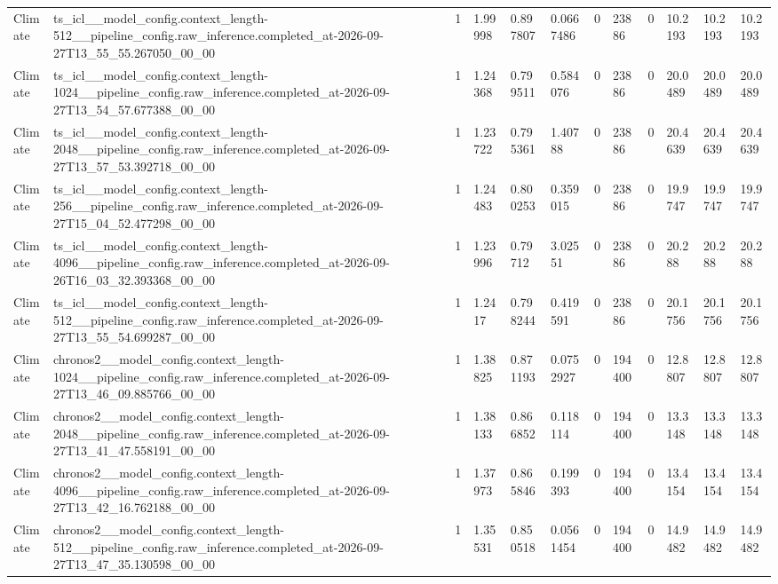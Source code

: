 \begin{tabular}{llllllllllll}
Climate & ts\_icl\_\_model\_config.context\_length-512\_\_pipeline\_config.raw\_inference.completed\_at-2026-09-27T13\_55\_55.267050\_00\_00 & 1 & 1.99998 & 0.897807 & 0.0667486 & 0 & 23886 & 0 & 10.2193 & 10.2193 & 10.2193 \\
Climate & ts\_icl\_\_model\_config.context\_length-1024\_\_pipeline\_config.raw\_inference.completed\_at-2026-09-27T13\_54\_57.677388\_00\_00 & 1 & 1.24368 & 0.799511 & 0.584076 & 0 & 23886 & 0 & 20.0489 & 20.0489 & 20.0489 \\
Climate & ts\_icl\_\_model\_config.context\_length-2048\_\_pipeline\_config.raw\_inference.completed\_at-2026-09-27T13\_57\_53.392718\_00\_00 & 1 & 1.23722 & 0.795361 & 1.40788 & 0 & 23886 & 0 & 20.4639 & 20.4639 & 20.4639 \\
Climate & ts\_icl\_\_model\_config.context\_length-256\_\_pipeline\_config.raw\_inference.completed\_at-2026-09-27T15\_04\_52.477298\_00\_00 & 1 & 1.24483 & 0.800253 & 0.359015 & 0 & 23886 & 0 & 19.9747 & 19.9747 & 19.9747 \\
Climate & ts\_icl\_\_model\_config.context\_length-4096\_\_pipeline\_config.raw\_inference.completed\_at-2026-09-26T16\_03\_32.393368\_00\_00 & 1 & 1.23996 & 0.79712 & 3.02551 & 0 & 23886 & 0 & 20.288 & 20.288 & 20.288 \\
Climate & ts\_icl\_\_model\_config.context\_length-512\_\_pipeline\_config.raw\_inference.completed\_at-2026-09-27T13\_55\_54.699287\_00\_00 & 1 & 1.2417 & 0.798244 & 0.419591 & 0 & 23886 & 0 & 20.1756 & 20.1756 & 20.1756 \\
Climate & chronos2\_\_model\_config.context\_length-1024\_\_pipeline\_config.raw\_inference.completed\_at-2026-09-27T13\_46\_09.885766\_00\_00 & 1 & 1.38825 & 0.871193 & 0.0752927 & 0 & 194400 & 0 & 12.8807 & 12.8807 & 12.8807 \\
Climate & chronos2\_\_model\_config.context\_length-2048\_\_pipeline\_config.raw\_inference.completed\_at-2026-09-27T13\_41\_47.558191\_00\_00 & 1 & 1.38133 & 0.866852 & 0.118114 & 0 & 194400 & 0 & 13.3148 & 13.3148 & 13.3148 \\
Climate & chronos2\_\_model\_config.context\_length-4096\_\_pipeline\_config.raw\_inference.completed\_at-2026-09-27T13\_42\_16.762188\_00\_00 & 1 & 1.37973 & 0.865846 & 0.199393 & 0 & 194400 & 0 & 13.4154 & 13.4154 & 13.4154 \\
Climate & chronos2\_\_model\_config.context\_length-512\_\_pipeline\_config.raw\_inference.completed\_at-2026-09-27T13\_47\_35.130598\_00\_00 & 1 & 1.35531 & 0.850518 & 0.0561454 & 0 & 194400 & 0 & 14.9482 & 14.9482 & 14.9482 \\

\end{tabular}
